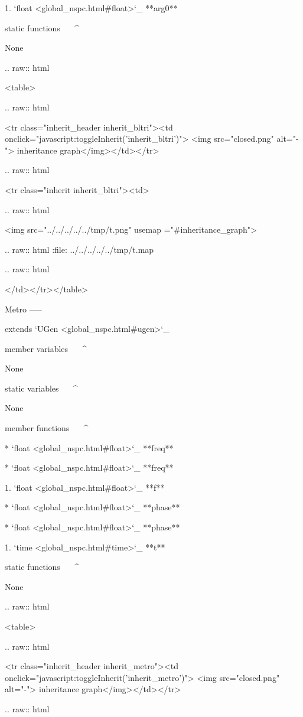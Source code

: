		1. `float <global_nspc.html#float>`_ **arg0**

static functions
^^^^^^^^^^^^^^^^


	None


  .. raw:: html

   <table>


  .. raw:: html

   <tr class="inherit_header inherit_bltri"><td onclick="javascript:toggleInherit('inherit_bltri')"> <img src="closed.png" alt="-"> inheritance graph</img></td></tr>


  .. raw:: html

   <tr class="inherit inherit_bltri"><td>


  .. raw:: html

   <img src="../../../../../tmp/t.png" usemap ="#inheritance_graph">


  .. raw:: html
   :file:   ../../../../../tmp/t.map


  .. raw:: html

   </td></tr></table>

Metro
-----

extends `UGen <global_nspc.html#ugen>`_ 

member variables
^^^^^^^^^^^^^^^^

	None

static variables
^^^^^^^^^^^^^^^^

	None

member functions
^^^^^^^^^^^^^^^^

	* `float <global_nspc.html#float>`_ **freq**

	* `float <global_nspc.html#float>`_ **freq**

		1. `float <global_nspc.html#float>`_ **f**

	* `float <global_nspc.html#float>`_ **phase**

	* `float <global_nspc.html#float>`_ **phase**

		1. `time <global_nspc.html#time>`_ **t**

static functions
^^^^^^^^^^^^^^^^


	None


  .. raw:: html

   <table>


  .. raw:: html

   <tr class="inherit_header inherit_metro"><td onclick="javascript:toggleInherit('inherit_metro')"> <img src="closed.png" alt="-"> inheritance graph</img></td></tr>


  .. raw:: html

